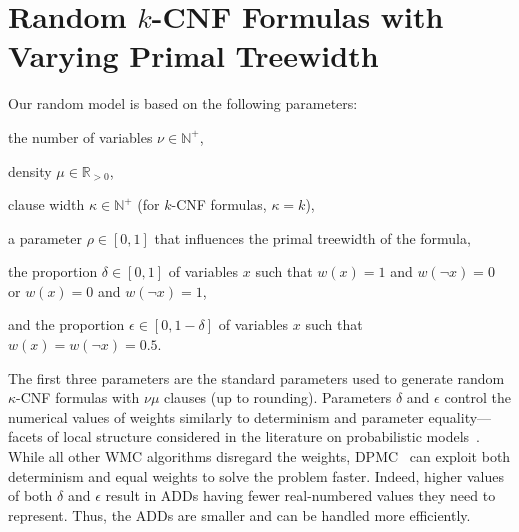 \documentclass[runningheads]{llncs}
\begin{document}
\section{Random $k$-CNF Formulas with Varying Primal Treewidth}\label{sec:model}

Our random model is based on the following parameters:
\begin{enumerate*}[(a)]
\item the number of variables $\nu \in \mathbb{N}^+$,
\item density $\mu \in \mathbb{R}_{>0}$,
\item clause width $\kappa \in \mathbb{N}^+$ (for $k$-CNF formulas, $\kappa =
  k$),
\item a parameter $\rho \in [0, 1]$ that influences the primal treewidth of
  the formula,
\item the proportion $\delta \in [0, 1]$ of variables $x$ such that $w(x) = 1$
  and $w(\neg x) = 0$ or $w(x) = 0$ and $w(\neg x) = 1$,
\item and the proportion $\epsilon \in [0, 1-\delta]$ of variables $x$ such that
  $w(x) = w(\neg x) = 0.5$.
\end{enumerate*}
The first three parameters are the standard parameters used to generate random
$\kappa$-CNF formulas with $\nu\mu$ clauses (up to rounding). Parameters
$\delta$ and $\epsilon$ control the numerical values of weights similarly to
determinism and parameter equality---facets of local structure considered in the
literature on probabilistic models~\cite{DBLP:journals/ai/VlasselaerMBR16}.
While all other \textsf{WMC} algorithms disregard the weights,
\textsc{DPMC}~\cite{DBLP:conf/cp/DudekPV20} can exploit both determinism and
equal weights to solve the problem faster. Indeed, higher values of both
$\delta$ and $\epsilon$ result in ADDs having fewer real-numbered values they
need to represent. Thus, the ADDs are smaller and can be handled more
efficiently.


\end{document}
